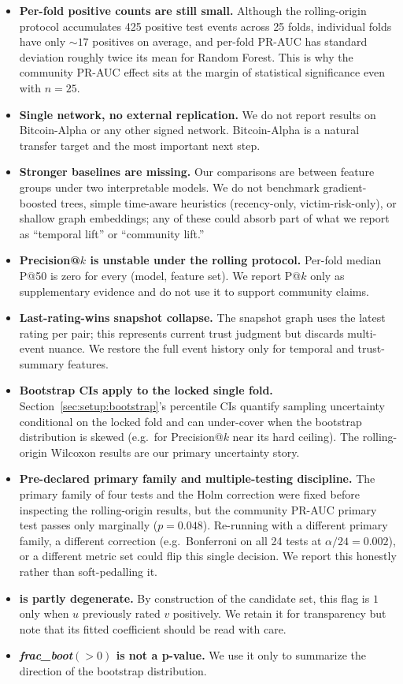 \begin{itemize}
\item \textbf{Per-fold positive counts are still small.} Although
the rolling-origin protocol accumulates 425 positive test events
across 25 folds, individual folds have only $\sim 17$ positives on
average, and per-fold PR-AUC has standard deviation roughly twice
its mean for Random Forest. This is why the community PR-AUC effect
sits at the margin of statistical significance even with $n = 25$.
\item \textbf{Single network, no external replication.} We do not
report results on Bitcoin-Alpha or any other signed network.
Bitcoin-Alpha is a natural transfer target and the most important
next step.
\item \textbf{Stronger baselines are missing.} Our comparisons are
between feature groups under two interpretable models. We do not
benchmark gradient-boosted trees, simple time-aware heuristics
(recency-only, victim-risk-only), or shallow graph embeddings; any
of these could absorb part of what we report as ``temporal lift''
or ``community lift.''
\item \textbf{Precision@$k$ is unstable under the rolling
protocol.} Per-fold median P@50 is zero for every (model, feature
set). We report P@$k$ only as supplementary evidence and do not use
it to support community claims.
\item \textbf{Last-rating-wins snapshot collapse.} The snapshot
graph uses the latest rating per pair; this represents current
trust judgment but discards multi-event nuance. We restore the full
event history only for temporal and trust-summary features.
\item \textbf{Bootstrap CIs apply to the locked single fold.}
Section~\ref{sec:setup:bootstrap}'s percentile CIs quantify sampling
uncertainty conditional on the locked fold and can under-cover when
the bootstrap distribution is skewed (e.g.\ for Precision@$k$ near
its hard ceiling). The rolling-origin Wilcoxon results are our
primary uncertainty story.
\item \textbf{Pre-declared primary family and multiple-testing
discipline.} The primary family of four tests and the Holm
correction were fixed before inspecting the rolling-origin results,
but the community PR-AUC primary test passes only marginally
($p = 0.048$). Re-running with a different primary family, a
different correction (e.g.\ Bonferroni on all 24 tests at
$\alpha / 24 = 0.002$), or a different metric set could flip this
single decision. We report this honestly rather than
soft-pedalling it.
\item \textbf{ is partly degenerate.} By
construction of the candidate set, this flag is $1$ only when $u$
previously rated $v$ positively. We retain it for transparency but
note that its fitted coefficient should be read with care.
\item \textbf{\emph{frac\_boot}$(>0)$ is not a p-value.} We use it
only to summarize the direction of the bootstrap distribution.
\end{itemize}

